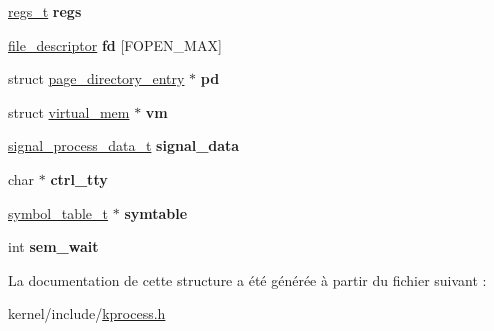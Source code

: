 \begin{DoxyCompactItemize}
\item 
\hypertarget{structprocess__t_ac06891b69a96f5f2da7e467e3c4fcc34}{\hyperlink{structregs__t}{regs\-\_\-t} {\bfseries regs}}\label{structprocess__t_ac06891b69a96f5f2da7e467e3c4fcc34}

\item 
\hypertarget{structprocess__t_a36b1262923c31b95f120cc9b0fb89744}{\hyperlink{struct__file__descriptor}{file\-\_\-descriptor} {\bfseries fd} \mbox{[}\-F\-O\-P\-E\-N\-\_\-\-M\-A\-X\mbox{]}}\label{structprocess__t_a36b1262923c31b95f120cc9b0fb89744}

\item 
\hypertarget{structprocess__t_a4fdbb20004015f653edfd8f9a3f22bde}{struct \hyperlink{structpage__directory__entry}{page\-\_\-directory\-\_\-entry} $\ast$ {\bfseries pd}}\label{structprocess__t_a4fdbb20004015f653edfd8f9a3f22bde}

\item 
\hypertarget{structprocess__t_a5a27e517888b2d262fc0f48df67a0ffb}{struct \hyperlink{structvirtual__mem}{virtual\-\_\-mem} $\ast$ {\bfseries vm}}\label{structprocess__t_a5a27e517888b2d262fc0f48df67a0ffb}

\item 
\hypertarget{structprocess__t_a38e0473349d20cb95b511d8be0a82323}{\hyperlink{structsignal__process__data__t}{signal\-\_\-process\-\_\-data\-\_\-t} {\bfseries signal\-\_\-data}}\label{structprocess__t_a38e0473349d20cb95b511d8be0a82323}

\item 
\hypertarget{structprocess__t_a345124afd3f5f75fdc291d9076348950}{char $\ast$ {\bfseries ctrl\-\_\-tty}}\label{structprocess__t_a345124afd3f5f75fdc291d9076348950}

\item 
\hypertarget{structprocess__t_a2d3232975904be6c800c2cdb6ef73732}{\hyperlink{structsymbol__table__t}{symbol\-\_\-table\-\_\-t} $\ast$ {\bfseries symtable}}\label{structprocess__t_a2d3232975904be6c800c2cdb6ef73732}

\item 
\hypertarget{structprocess__t_a99c0e9d8a303b8890da048861e8c560e}{int {\bfseries sem\-\_\-wait}}\label{structprocess__t_a99c0e9d8a303b8890da048861e8c560e}

\end{DoxyCompactItemize}


\-La documentation de cette structure a été générée à partir du fichier suivant \-:\begin{DoxyCompactItemize}
\item 
kernel/include/\hyperlink{kprocess_8h}{kprocess.\-h}\end{DoxyCompactItemize}
